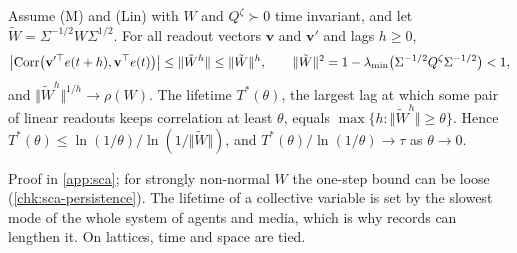 \begin{proposition}\label{prop:sca-persistence}
Assume \textup{(M)} and \textup{(Lin)} with $W$ and $Q^\zeta\succ0$ time invariant, and let $\tilde W=\Sigma^{-1/2}W\Sigma^{1/2}$. For all readout vectors $\mathbf v$ and $\mathbf v'$ and lags $h\ge0$,
\begin{equation}\label{eq:sca-persistence}
\bigl|\operatorname{Corr}\bigl(\mathbf v'^\top e(t+h),\mathbf v^\top e(t)\bigr)\bigr|\le\Vert\tilde W^h\Vert\le\Vert\tilde W\Vert^h,\qquad\Vert\tilde W\Vert^2=1-\lambda_{\min}\bigl(\Sigma^{-1/2}Q^\zeta\Sigma^{-1/2}\bigr)<1,
\end{equation}
and $\Vert\tilde W^h\Vert^{1/h}\to\rho(W)$. The lifetime $T^\ast(\theta)$, the largest lag at which some pair of linear readouts keeps correlation at least $\theta$, equals $\max\{h:\Vert\tilde W^h\Vert\ge\theta\}$. Hence $T^\ast(\theta)\le\ln(1/\theta)/\ln(1/\Vert\tilde W\Vert)$, and $T^\ast(\theta)/\ln(1/\theta)\to\tau$ as $\theta\to0$.
\end{proposition}
Proof in \cref{app:sca}; for strongly non-normal $W$ the one-step bound can be loose (\cref{chk:sca-persistence}). The lifetime of a collective variable is set by the slowest mode of the whole system of agents and media, which is why records can lengthen it. On lattices, time and space are tied.

